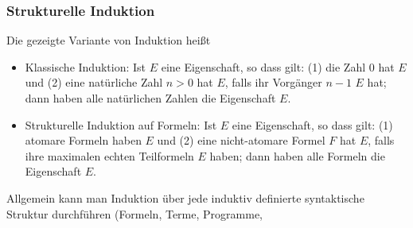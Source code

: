 \documentclass[aspectratio=1610,onlymath]{beamer}
\begin{document}
\begin{frame}\frametitle{Strukturelle Induktion}

Die gezeigte Variante von Induktion heißt 
\begin{itemize}
\item \alert{Klassische Induktion:} Ist $E$ eine Eigenschaft, so dass gilt:
(1) die Zahl $0$ hat $E$ und (2) eine natürliche Zahl $n>0$ hat $E$, falls ihr Vorgänger $n-1$ $E$ hat;
dann haben alle natürlichen Zahlen die Eigenschaft $E$.
\item \alert{Strukturelle Induktion auf Formeln:} Ist $E$ eine Eigenschaft, so dass gilt:
(1) atomare Formeln haben $E$ und (2) eine nicht-atomare Formel $F$ hat $E$, falls ihre maximalen echten Teilformeln $E$ haben;
dann haben alle Formeln die Eigenschaft $E$.
\end{itemize}
Allgemein kann man Induktion über jede induktiv definierte syntaktische Struktur durchführen (Formeln, Terme, Programme, \ghost{\ldots)}\medskip\pause


\end{frame}
\end{document}
